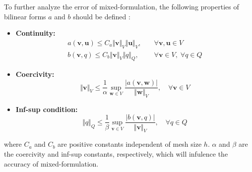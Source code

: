 To further analyze the error of mixed-formulation, the following properties of bilinear forms $a$ and $b$ should be defined \cite{brenner2008}:
\begin{itemize}
\item \textbf{Continuity:}    
\begin{align}
a(\boldsymbol v, \boldsymbol u) \le C_a \Vert \boldsymbol v \Vert_V \Vert \boldsymbol u \Vert_V, &\quad \forall \boldsymbol v, \boldsymbol u \in V \label{continuity_1} \\    
b(\boldsymbol v, q) \le C_b \Vert \boldsymbol v \Vert_V \Vert q \Vert_Q, &\quad \forall \boldsymbol v \in V, \; \forall q \in Q \label{continuity_2}
\end{align}
\item \textbf{Coercivity:}
\begin{equation}\label{coercivity}
\Vert \boldsymbol v \Vert_V \le \frac{1}{\alpha} \sup_{\boldsymbol w \in V} \frac{\vert a(\boldsymbol v, \boldsymbol w) \vert}{\Vert \boldsymbol w \Vert_V}, \quad \forall \boldsymbol v \in V
\end{equation}
\item \textbf{Inf-sup condition:}
\begin{equation}\label{inf-sup}
\Vert q \Vert_Q \le \frac{1}{\beta} \sup_{\boldsymbol v \in V} \frac{\vert b(\boldsymbol v, q) \vert}{\Vert \boldsymbol v \Vert_V}, \quad \forall q \in Q
\end{equation}
\end{itemize}
where $C_a$ and $C_b$ are positive constants independent of mesh size $h$. 
$\alpha$ and $\beta$ are the coercivity and inf-sup constants, respectively, which will infulence the accuracy of mixed-formulation.

